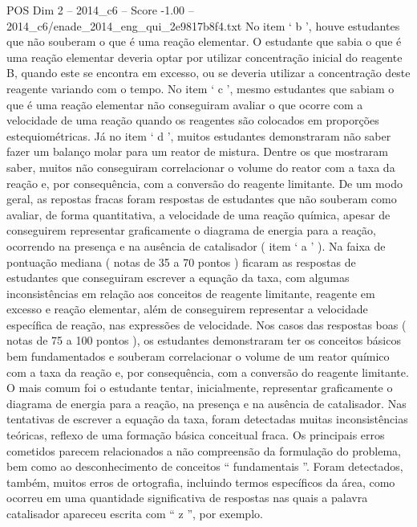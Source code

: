 \begin{textsample}{POS Dim 2 – 2014\_c6 – Score -1.00 – 2014\_c6/enade\_2014\_eng\_qui\_2e9817b8f4.txt}
No item ‘ b ’, houve estudantes que não souberam o que é uma reação elementar.
O estudante que sabia o que é uma reação elementar deveria optar por utilizar concentração inicial do reagente B, quando este se encontra em excesso, ou se deveria utilizar a concentração deste reagente variando com o tempo.
No item ‘ c ’, mesmo estudantes que sabiam o que é uma reação elementar não conseguiram avaliar o que ocorre com a velocidade de uma reação quando os reagentes são colocados em proporções estequiométricas.
Já no item ‘ d ’, muitos estudantes demonstraram não saber fazer um balanço molar para um reator de mistura.
Dentre os que mostraram saber, muitos não conseguiram correlacionar o volume do reator com a taxa da reação e, por consequência, com a conversão do reagente limitante.
De um modo geral, as repostas fracas foram respostas de estudantes que não souberam como avaliar, de forma quantitativa, a velocidade de uma reação química, apesar de conseguirem representar graficamente o diagrama de energia para a reação, ocorrendo na presença e na ausência de catalisador ( item ‘ a ’ ).
Na faixa de pontuação mediana ( notas de 35 a 70 pontos ) ficaram as respostas de estudantes que conseguiram escrever a equação da taxa, com algumas inconsistências em relação aos conceitos de reagente limitante, reagente em excesso e reação elementar, além de conseguirem representar a velocidade específica de reação, nas expressões de velocidade.
Nos casos das respostas boas ( notas de 75 a 100 pontos ), os estudantes demonstraram ter os conceitos básicos bem fundamentados e souberam correlacionar o volume de um reator químico com a taxa da reação e, por consequência, com a conversão do reagente limitante.
O mais comum foi o estudante tentar, inicialmente, representar graficamente o diagrama de energia para a reação, na presença e na ausência de catalisador.
Nas tentativas de escrever a equação da taxa, foram detectadas muitas inconsistências teóricas, reflexo de uma formação básica conceitual fraca.
Os principais erros cometidos parecem relacionados a não compreensão da formulação do problema, bem como ao desconhecimento de conceitos “ fundamentais ”.
Foram detectados, também, muitos erros de ortografia, incluindo termos específicos da área, como ocorreu em uma quantidade significativa de respostas nas quais a palavra catalisador apareceu escrita com “ z ”, por exemplo.

\end{textsample}
